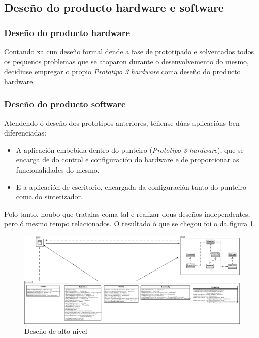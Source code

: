  \subsection{Deseño do producto hardware e software}

  \subsubsection{Deseño do producto hardware}

  Contando xa cun deseño formal dende a fase de prototipado e solventados todos
  os pequenos problemas que se atoparon durante o desenvolvemento do mesmo,
  decidiuse empregar o propio \textit{Prototipo 3 hardware} coma deseño do
  producto hardware.

  \subsubsection{Deseño do producto software}

  Atendendo ó deseño dos prototipos anteriores, téñense dúas aplicacións ben
  diferenciadas:

  \begin{itemize}
   \item A aplicación embebida dentro do punteiro
         (\textit{Prototipo 3 hardware}), que se encarga de do control e
         configuración do hardware e de proporcionar as funcionalidades do
         mesmo.
   \item E a aplicación de escritorio, encargada da configuración tanto do
         punteiro coma do sintetizador.
  \end{itemize}

  Polo tanto, houbo que tratalas coma tal e realizar dous deseños
  independentes, pero ó mesmo tempo relacionados. O resultado ó que se chegou
  foi o da figura \ref{figura:DesenoAltoNivel}.

  \begin{figure}[htbp]
   \centering
   \includegraphics[scale=0.25,angle=90,keepaspectratio=true]{./imagenes/desenho-an.png}
   \caption{Deseño de alto nivel}
   \label{figura:DesenoAltoNivel}
  \end{figure}

